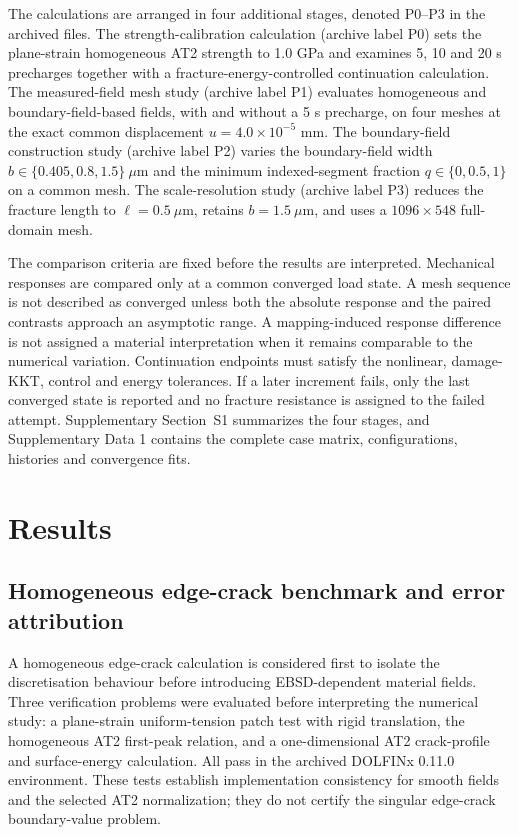 \documentclass[preprint,12pt]{elsarticle}
\begin{document}
The calculations are arranged in four additional stages, denoted P0--P3 in the
archived files. The strength-calibration calculation (archive label P0) sets the plane-strain homogeneous AT2 strength to 1.0 GPa and
examines 5, 10 and 20 s precharges together with a fracture-energy-controlled
continuation calculation. The measured-field mesh study (archive label P1) evaluates homogeneous and boundary-field-based fields, with
and without a 5 s precharge, on four meshes at the exact common displacement
\(u=4.0\times10^{-5}\) mm. The boundary-field construction study (archive label P2) varies the boundary-field width
\(b\in\{0.405,0.8,1.5\}~\mu\mathrm{m}\) and the minimum indexed-segment fraction
\(q\in\{0,0.5,1\}\) on a common mesh. The scale-resolution study (archive label P3) reduces the fracture length to
\(\ell=0.5~\mu\mathrm{m}\), retains \(b=1.5~\mu\mathrm{m}\), and uses a
\(1096\times548\) full-domain mesh.

The comparison criteria are fixed before the results are interpreted. Mechanical
responses are compared only at a common converged load state. A mesh sequence is
not described as converged unless both the absolute response and the paired
contrasts approach an asymptotic range. A mapping-induced response difference is
not assigned a material interpretation when it remains comparable to the
numerical variation. Continuation endpoints must satisfy the nonlinear,
damage-KKT, control and energy tolerances. If a later increment fails, only the
last converged state is reported and no fracture resistance is assigned to the
failed attempt. Supplementary Section~S1 summarizes the four stages, and
Supplementary Data 1 contains the complete case matrix, configurations, histories
and convergence fits.
\section{Results}\label{sec:results}

\subsection{Homogeneous edge-crack benchmark and error attribution}
A homogeneous edge-crack calculation is considered first to isolate the
discretisation behaviour before introducing EBSD-dependent material fields.
Three verification problems were evaluated before interpreting the numerical study: a plane-strain uniform-tension patch test with rigid translation, the homogeneous AT2 first-peak relation, and a one-dimensional AT2 crack-profile and surface-energy calculation. All pass in the archived DOLFINx 0.11.0 environment. These tests establish implementation consistency for smooth fields and the selected AT2 normalization; they do not certify the singular edge-crack boundary-value problem.
\end{document}
